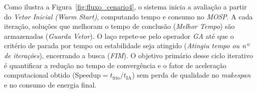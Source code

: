 Como ilustra a Figura~\ref{fig:fluxo_cenario4}, o sistema inicia a avaliação a partir do \textit{Vetor Inicial (Warm Start)}, computando tempo e consumo no \textit{MOSP}. A cada iteração, soluções que melhoram o tempo de conclusão (\textit{Melhor Tempo}) são armazenadas (\textit{Guarda Vetor}). O laço repete-se pelo operador \textit{GA} até que o critério de parada por tempo ou estabilidade seja atingido (\textit{Atingiu tempo ou nº de iterações}), encerrando a busca (\textit{FIM}). O objetivo primário desse ciclo iterativo é quantificar a redução no tempo de convergência e o fator de aceleração computacional obtido ($\text{Speedup} = t_{\text{frio}} / t_{\text{IA}}$) sem perda de qualidade no \textit{makespan} e no consumo de energia final.
